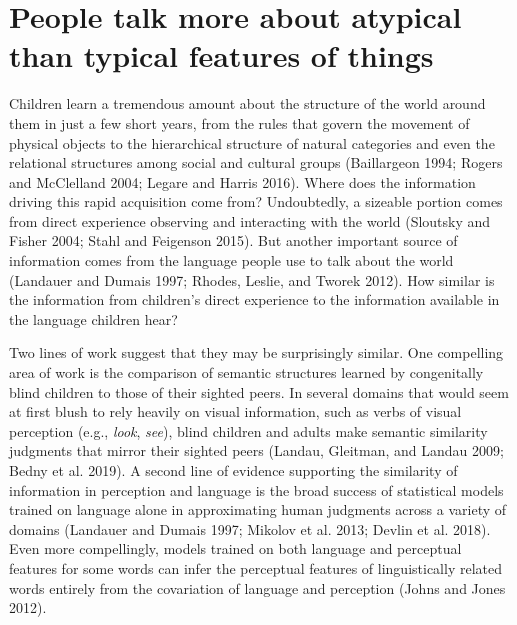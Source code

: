 \documentclass{ucetd}
\begin{document}
\hypertarget{people-talk-more-about-atypical-than-typical-features-of-things}{%
\chapter{People talk more about atypical than typical features of
things}\label{people-talk-more-about-atypical-than-typical-features-of-things}}

Children learn a tremendous amount about the structure of the world
around them in just a few short years, from the rules that govern the
movement of physical objects to the hierarchical structure of natural
categories and even the relational structures among social and cultural
groups (Baillargeon 1994; Rogers and McClelland 2004; Legare and Harris
2016). Where does the information driving this rapid acquisition come
from? Undoubtedly, a sizeable portion comes from direct experience
observing and interacting with the world (Sloutsky and Fisher 2004;
Stahl and Feigenson 2015). But another important source of information
comes from the language people use to talk about the world (Landauer and
Dumais 1997; Rhodes, Leslie, and Tworek 2012). How similar is the
information from children's direct experience to the information
available in the language children hear?

Two lines of work suggest that they may be surprisingly similar. One
compelling area of work is the comparison of semantic structures learned
by congenitally blind children to those of their sighted peers. In
several domains that would seem at first blush to rely heavily on visual
information, such as verbs of visual perception (e.g., \emph{look},
\emph{see}), blind children and adults make semantic similarity
judgments that mirror their sighted peers (Landau, Gleitman, and Landau
2009; Bedny et al. 2019). A second line of evidence supporting the
similarity of information in perception and language is the broad
success of statistical models trained on language alone in approximating
human judgments across a variety of domains (Landauer and Dumais 1997;
Mikolov et al. 2013; Devlin et al. 2018). Even more compellingly, models
trained on both language and perceptual features for some words can
infer the perceptual features of linguistically related words entirely
from the covariation of language and perception (Johns and Jones 2012).
\end{document}
